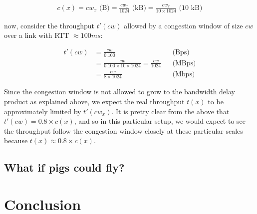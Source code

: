 \documentclass[12pt,a4paper]{article}
\begin{document}
\begin{align*}
  c(x) = cw_x \text{\ (B)}
       = \frac{cw_x}{1024} \text{\ (kB)}
       = \frac{cw_x}{10 \times 1024} \text{\ (10 kB)}
\end{align*}

now, consider the throughput $t'(cw)$ allowed by a congestion window of size
$cw$ over a link with RTT $\approx 100ms$:

\begin{align*}
  t'(cw) &= \frac{cw}{0.100}                       &&\text{(Bps)} \\
         &= \frac{cw}{0.100 \times 10 \times 1024}
          = \frac{cw}{1024}                        &&\text{(MBps)} \\
         &= \frac{cw}{8 \times 1024}               &&\text{(Mbps)}
\end{align*}

Since the congestion window is not allowed to grow to the bandwidth delay
product as explained above, we expect the real throughput $t(x)$ to be
approximately limited by $t'(cw_x)$. It is pretty clear from the above that
$t'(cw) = 0.8 \times c(x)$, and so in this particular setup, we would expect to
see the throughput follow the congestion window closely at these particular
scales because $t(x) \approx 0.8 \times c(x)$.

\subsection{What if pigs could fly?} %

\section{Conclusion}

%
\end{document}
